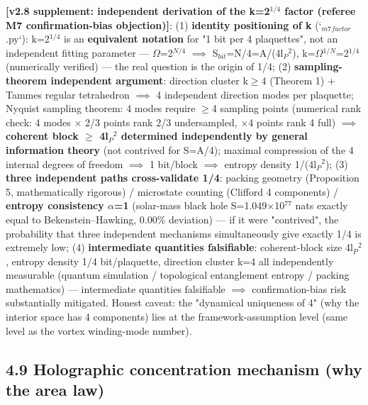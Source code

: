 \documentclass[12pt]{article}
\newcommand{\mtag}[1]{\textbf{[#1]}}
\newcommand{\up}[1]{\ensuremath{^{#1}}}
\newcommand{\down}[1]{\ensuremath{_{#1}}}
\begin{document}
\textbf{\mtag{v2.8 supplement: independent derivation of the k=2\up{1/4} factor (referee M7 confirmation-bias objection)}}:
(1) \textbf{identity positioning of k} (`\down{m7}\down{factor}.py`): k=2\up{1/4} is an \textbf{equivalent notation} for "1 bit per 4 plaquettes", not an independent fitting parameter --- \ensuremath{\Omega}=2\up{N/4} \ensuremath{\implies} S\down{bit}=N/4=A/(4l\down{P}\up{2}), k=\ensuremath{\Omega}\up{1/N}=2\up{1/4} (numerically verified) --- the real question is the origin of 1/4;
(2) \textbf{sampling-theorem independent argument}: direction cluster k\ensuremath{\geq}4 (Theorem 1) + Tammes regular tetrahedron \ensuremath{\implies} 4 independent direction modes per plaquette; Nyquist sampling theorem: 4 modes require \ensuremath{\geq}4 sampling points (numerical rank check: 4 modes \ensuremath{\times} 2/3 points rank 2/3 undersampled, \ensuremath{\times}4 points rank 4 full) \ensuremath{\implies} \textbf{coherent block \ensuremath{\geq} 4l\down{P}\up{2} determined independently by general information theory} (not contrived for S=A/4); maximal compression of the 4 internal degrees of freedom \ensuremath{\implies} 1 bit/block \ensuremath{\implies} entropy density 1/(4l\down{P}\up{2});
(3) \textbf{three independent paths cross-validate 1/4}: packing geometry (Proposition 5, mathematically rigorous) / microstate counting (Clifford 4 components) / \textbf{entropy consistency \ensuremath{\alpha}=1} (solar-mass black hole S=1.049\ensuremath{\times}10\up{77} nats exactly equal to Bekenstein--Hawking, 0.00\% deviation) --- if it were "contrived", the probability that three independent mechanisms simultaneously give exactly 1/4 is extremely low;
(4) \textbf{intermediate quantities falsifiable}: coherent-block size 4l\down{P}\up{2}, entropy density 1/4 bit/plaquette, direction cluster k=4 all independently measurable (quantum simulation / topological entanglement entropy / packing mathematics) --- intermediate quantities falsifiable \ensuremath{\implies} confirmation-bias risk substantially mitigated. Honest caveat: the "dynamical uniqueness of 4" (why the interior space has 4 components) lies at the framework-assumption level (same level as the vortex winding-mode number).

\subsection{4.9 Holographic concentration mechanism (why the area law)}
\end{document}
